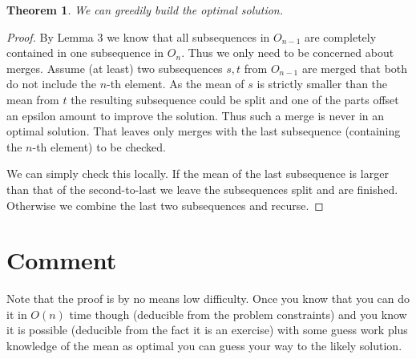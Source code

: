 \documentclass{article}
\newtheorem{theorem}{Theorem}
\begin{document}
\begin{theorem}
We can greedily build the optimal solution.
\end{theorem}
\begin{proof}
By Lemma 3 we know that all subsequences in $O_{n-1}$ are completely contained in one subsequence in $O_n$.
Thus we only need to be concerned about merges.
Assume (at least) two subsequences $s,t$ from $O_{n-1}$ are merged that both do not include the $n$-th element.
As the mean of $s$ is strictly smaller than the mean from $t$ the resulting subsequence could be split and one of the parts offset an epsilon amount to improve the solution. Thus such a merge is never in an optimal solution.
That leaves only merges with the last subsequence (containing the $n$-th element) to be checked.

We can simply check this locally. If the mean of the last subsequence is larger than that of the second-to-last we leave the subsequences split and are finished. Otherwise we combine the last two subsequences and recurse.
\end{proof}

\section*{Comment}
Note that the proof is by no means low difficulty.
Once you know that you can do it in $O(n)$ time though (deducible from the problem constraints) and you know it is possible (deducible from the fact it is an exercise) with some guess work plus knowledge of the mean as optimal you can guess your way to the likely solution.
\end{document}
